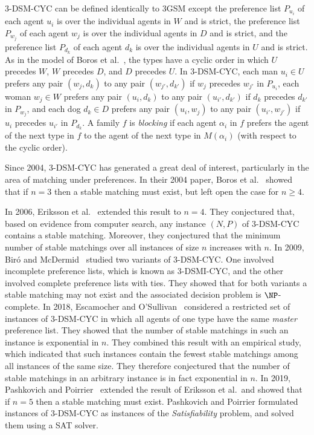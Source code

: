 3-DSM-CYC can be defined identically to 3GSM except the preference list $P_{u_i}$ of each agent $u_i$ is over the individual agents in $W$ and is strict, the preference list $P_{w_j}$ of each agent $w_j$ is over the individual agents in $D$ and is strict, and the preference list  $P_{d_k}$ of each agent $d_k$ is over the individual agents in $U$ and is strict. As in the model of Boros et al.~\cite{BGJK04}, the types have a cyclic order in which $U$ precedes $W$, $W$ precedes $D$, and $D$ precedes $U$. In 3-DSM-CYC, each man $u_i \in U$ prefers any pair $( w_j, d_k )$ to any pair $( w_{j'}, d_{k'} )$ if $w_j$ precedes $w_{j'}$ in $P_{u_i}$, each woman $w_j \in W$ prefers any pair $( u_i, d_k )$ to any pair $( u_{i'}, d_{k'} )$ if $d_k$ precedes $d_{k'}$ in $P_{w_j}$, and each dog $d_k \in D$ prefers any pair $( u_i, w_j )$ to any pair $( u_{i'}, w_{j'} )$ if $u_i$ precedes $u_{i'}$ in $P_{d_k}$. A family $f$ is \emph{blocking} if each agent $\alpha_i$ in $f$ prefers the agent of the next type in $f$ to the agent of the next type in $M(\alpha_i)$ (with respect to the cyclic order).

Since 2004, 3-DSM-CYC has generated a great deal of interest, particularly in the area of matching under preferences. In their 2004 paper, Boros et al.~\cite{BGJK04} showed that if $n=3$ then a stable matching must exist, but left open the case for $n \geq 4$.

In 2006, Eriksson et al.~\cite{ESS06} extended this result to $n = 4$. They conjectured that, based on evidence from computer search, any instance $(N, P)$ of 3-DSM-CYC contains a stable matching. Moreover, they conjectured that the minimum number of stable matchings over all instances of size $n$ increases with $n$. In 2009, Bir\'o and McDermid~\cite{BM10} studied two variants of 3-DSM-CYC. One involved incomplete preference lists, which is known as 3-DSMI-CYC, and the other involved complete preference lists with ties. They showed that for both variants a stable matching may not exist and the associated decision problem is $\NP$-complete. In 2018, Escamocher and O'Sullivan~\cite{Escamocher2018} considered a restricted set of instances of 3-DSM-CYC in which all agents of one type have the same \emph{master} preference list. They showed that the number of stable matchings in such an instance is exponential in $n$. They combined this result with an empirical study, which indicated that such instances contain the fewest stable matchings among all instances of the same size. They therefore conjectured that the number of stable matchings in an arbitrary instance is in fact exponential in $n$. In 2019, Pashkovich and Poirrier~\cite{Pashkovich20} extended the result of Eriksson et al.\ and showed that if $n=5$ then a stable matching must exist. Pashkovich and Poirrier formulated instances of 3-DSM-CYC as instances of the \emph{Satisfiability} problem, and solved them using a SAT solver. 

